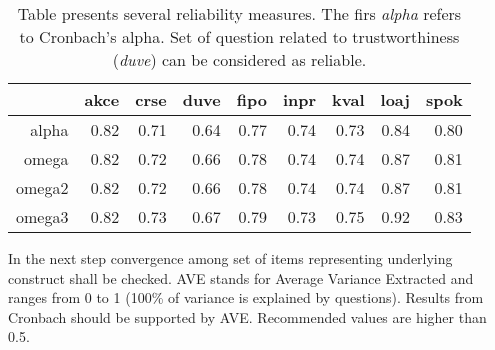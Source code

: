 \documentclass[10pt,a4paper]{article}
\begin{document}
\begin{table}[ht]
\centering
\caption{Table presents several reliability measures. The firs \emph{alpha} refers to Cronbach's alpha. Set of question related to trustworthiness (\emph{duve}) can be considered as reliable.}
\begin{tabular}{rrrrrrrrr}
  \hline
 & akce & crse & duve & fipo & inpr & kval & loaj & spok \\ 
  \hline
alpha & 0.82 & 0.71 & 0.64 & 0.77 & 0.74 & 0.73 & 0.84 & 0.80 \\ 
  omega & 0.82 & 0.72 & 0.66 & 0.78 & 0.74 & 0.74 & 0.87 & 0.81 \\ 
  omega2 & 0.82 & 0.72 & 0.66 & 0.78 & 0.74 & 0.74 & 0.87 & 0.81 \\ 
  omega3 & 0.82 & 0.73 & 0.67 & 0.79 & 0.73 & 0.75 & 0.92 & 0.83 \\ 
   \hline
\end{tabular}
\label{t:reliab}
\end{table}

In the next step convergence among set of items representing underlying construct shall be checked. AVE stands for Average Variance Extracted and ranges from 0 to 1 (100\% of variance is explained by questions). Results from Cronbach should be supported by AVE. Recommended values are higher than 0.5. 
\end{document}

